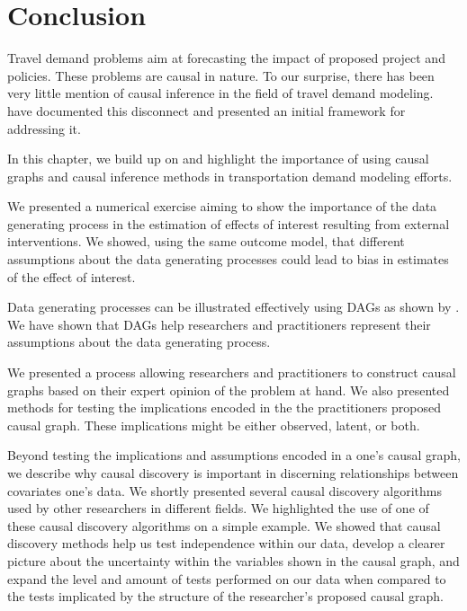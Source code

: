 \section{Conclusion}
\label{sec:conclusion}

Travel demand problems aim at forecasting the impact of proposed project and policies. These problems are causal in nature. 
To our surprise, there has been very little mention of causal inference in the field of travel demand modeling.
\citet{brathwaite_2018_causal} have documented this disconnect and presented an initial framework for addressing it.

In this chapter, we build up on \citet{brathwaite_2018_causal} and highlight the importance of using causal graphs and 
causal inference methods in transportation demand modeling efforts.

We presented a numerical exercise aiming to show the importance of  the data generating process in the estimation 
of effects of interest resulting from external interventions. 
We showed, using the same outcome model, that different assumptions about the data generating processes could 
lead to bias in estimates of the effect of interest.

Data generating processes can be illustrated effectively using DAGs as shown by \citet{pearl_1995_causal}.
We have shown that DAGs help researchers and practitioners represent their assumptions about the data generating process. 

We presented a process allowing researchers and practitioners to construct causal graphs based on their expert opinion of the problem at hand. 
We also presented methods for testing the implications encoded in the the practitioners proposed causal graph. 
These implications might be either observed, latent, or both.

Beyond testing the implications and assumptions encoded in a one's causal graph, we describe why causal discovery is important in discerning relationships between covariates one's data.
We shortly presented several causal discovery algorithms used by
other researchers in different fields. 
We highlighted the use of one of these causal discovery algorithms on a simple example. 
We showed that causal discovery methods help us test independence within our data, 
develop a clearer picture about the uncertainty within the variables shown in the causal graph, 
and expand the level and amount of tests performed on our data when compared to the tests implicated 
by the structure of the researcher's proposed causal graph.

